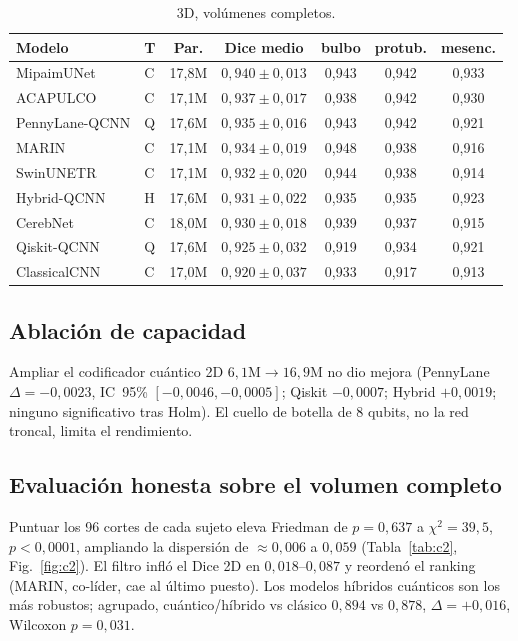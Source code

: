 \documentclass[runningheads]{llncs}
\begin{document}
\begin{table}[t]\centering
\caption{3D, volúmenes completos.}
\label{tab:3d}\small\setlength{\tabcolsep}{5pt}
\begin{tabular}{llccccc}
\toprule
Modelo & T & Par. & Dice medio & bulbo & protub. & mesenc.\\
\midrule
MipaimUNet & C & 17,8M & $0{,}940{\pm}0{,}013$ & 0,943 & 0,942 & 0,933\\
ACAPULCO & C & 17,1M & $0{,}937{\pm}0{,}017$ & 0,938 & 0,942 & 0,930\\
PennyLane-QCNN & Q & 17,6M & $0{,}935{\pm}0{,}016$ & 0,943 & 0,942 & 0,921\\
MARIN & C & 17,1M & $0{,}934{\pm}0{,}019$ & 0,948 & 0,938 & 0,916\\
SwinUNETR & C & 17,1M & $0{,}932{\pm}0{,}020$ & 0,944 & 0,938 & 0,914\\
Hybrid-QCNN & H & 17,6M & $0{,}931{\pm}0{,}022$ & 0,935 & 0,935 & 0,923\\
CerebNet & C & 18,0M & $0{,}930{\pm}0{,}018$ & 0,939 & 0,937 & 0,915\\
Qiskit-QCNN & Q & 17,6M & $0{,}925{\pm}0{,}032$ & 0,919 & 0,934 & 0,921\\
ClassicalCNN & C & 17,0M & $0{,}920{\pm}0{,}037$ & 0,933 & 0,917 & 0,913\\
\bottomrule
\end{tabular}
\end{table}

\subsection{Ablación de capacidad}
Ampliar el codificador cuántico 2D $6{,}1$M${\to}16{,}9$M no dio mejora
(PennyLane $\Delta{=}{-}0{,}0023$, IC~95\% $[-0{,}0046,-0{,}0005]$; Qiskit
$-0{,}0007$; Hybrid $+0{,}0019$; ninguno significativo tras Holm). El cuello de
botella de 8 qubits, no la red troncal, limita el rendimiento.

\subsection{Evaluación honesta sobre el volumen completo}
Puntuar los 96 cortes de cada sujeto eleva Friedman de $p{=}0{,}637$ a
$\chi^2{=}39{,}5$, $p{<}0{,}0001$, ampliando la dispersión de ${\approx}0{,}006$ a
$0{,}059$ (Tabla~\ref{tab:c2}, Fig.~\ref{fig:c2}). El filtro infló el Dice 2D en
$0{,}018$--$0{,}087$ y reordenó el ranking (MARIN, co-líder, cae al último
puesto). Los modelos híbridos cuánticos son los más robustos; agrupado,
cuántico/híbrido vs clásico $0{,}894$ vs $0{,}878$, $\Delta{=}{+}0{,}016$,
Wilcoxon $p{=}0{,}031$.
\end{document}
